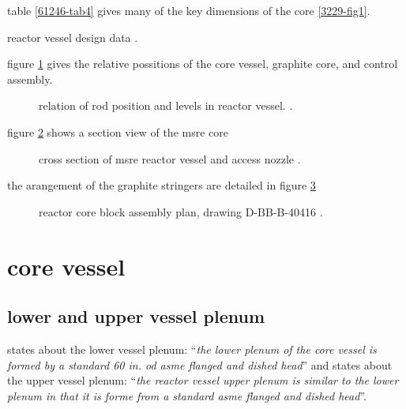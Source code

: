 \documentclass{article}
\begin{document}
\begin{preview}
table \ref{61246-tab4} gives many of the key dimensions of the core \ref{3229-fig1}.
\begin{table}[H]
  \centering
  \caption{reactor vessel design data \parencite[table 4]{ad-cf-61-2-46}.}
  \label{61246-tab4}
\end{table}

figure \ref{4233-fig2} gives the relative possitions of the core vessel, graphite core, and control assembly.
\begin{figure}[H]
  \centering
  \caption{relation of rod position and levels in reactor vessel. \parencite[table 4]{ornl-4233}.}
  \label{4233-fig2}
\end{figure}

figure \ref{0728-p109-p110} shows a section view of the msre core
\begin{figure}[H]
  \centering
  \caption{cross section of msre reactor vessel and access nozzle \parencite[page 109-110]{ornl-tm-0728}.}
  \label{0728-p109-p110}
\end{figure}

the arangement of the graphite stringers are detailed in figure \ref{4174-p10-p11}
\begin{figure}[H]
  \centering
  \caption{reactor core block assembly plan, drawing D-BB-B-40416 \parencite[page 10-11]{ornl-tm-4174}.}
  \label{4174-p10-p11}
\end{figure}

\section{core vessel}
\subsection{lower and upper vessel plenum}
\textcite[page 14]{ornl-tm-3229} states about the lower vessel plenum: \enquote{\textit{the lower plenum of the core vessel is formed by a standard 60 in. od asme flanged and dished head}} and \textcite[page 25]{ornl-tm-3229} states about the upper vessel plenum: \enquote{\textit{the reactor vessel upper plenum is similar to the lower plenum in that it is forme from a standard asme flanged and dished head}}.


\end{preview}
\end{document}
